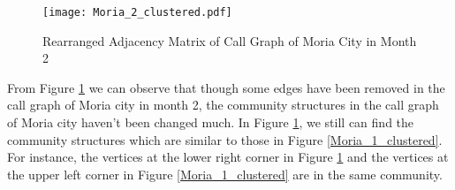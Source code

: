 \begin{figure}[ht]
\centering
\texttt{[image: Moria\_2\_clustered.pdf]}
\caption{Rearranged Adjacency Matrix of Call Graph of Moria City in Month 2}
\label{Moria_2_clustered}
\end{figure}

From Figure \ref{Moria_2_clustered} we can observe that though some edges have been removed in the call graph of Moria city in month 2, the community structures in the call graph of Moria city haven't been changed much. In  Figure \ref{Moria_2_clustered}, we still can find the community structures which are similar to those in Figure \ref{Moria_1_clustered}. For instance, the vertices at the lower right corner in Figure \ref{Moria_2_clustered} and the vertices at the upper left corner in Figure \ref{Moria_1_clustered} are in the same community.   

